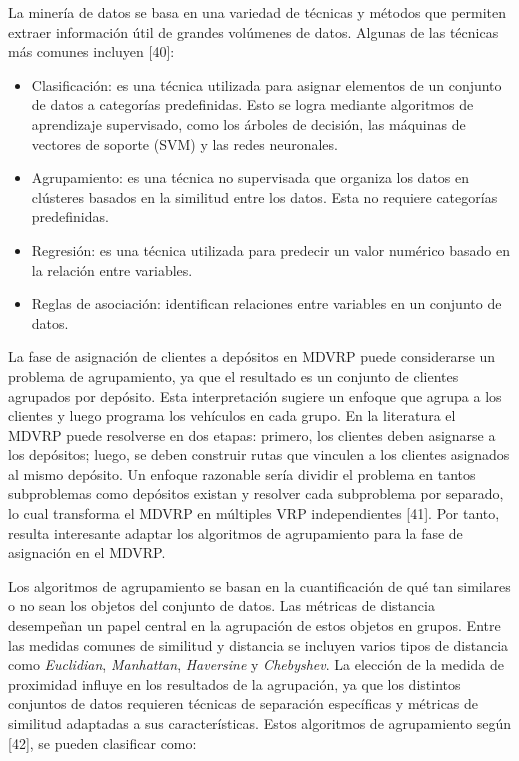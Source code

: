 La miner\'ia de datos se basa en una variedad de t\'ecnicas y m\'etodos que permiten extraer informaci\'on \'util de grandes vol\'umenes de datos. Algunas de las t\'ecnicas m\'as comunes incluyen [40]:

\begin{itemize}
  \item Clasificaci\'on: es una t\'ecnica utilizada para asignar elementos de un conjunto de datos a categor\'ias predefinidas. Esto se logra mediante algoritmos de aprendizaje supervisado, como los \'arboles de decisi\'on, las m\'aquinas de vectores de soporte (SVM) y las redes neuronales.
  \item Agrupamiento: es una t\'ecnica no supervisada que organiza los datos en cl\'usteres basados en la similitud entre los datos. Esta no requiere categor\'ias predefinidas.
  \item Regresi\'on: es una t\'ecnica utilizada para predecir un valor num\'erico basado en la relaci\'on entre variables.
  \item Reglas de asociaci\'on: identifican relaciones entre variables en un conjunto de datos.
\end{itemize}

La fase de asignaci\'on de clientes a dep\'ositos en MDVRP puede considerarse un problema de agrupamiento, ya que el resultado es un conjunto de clientes agrupados por dep\'osito. Esta interpretaci\'on sugiere un enfoque que agrupa a los clientes y luego programa los veh\'iculos en cada grupo. En la literatura el MDVRP puede resolverse en dos etapas: primero, los clientes deben asignarse a los dep\'ositos; luego, se deben construir rutas que vinculen a los clientes asignados al mismo dep\'osito. Un enfoque razonable ser\'ia dividir el problema en tantos subproblemas como dep\'ositos existan y resolver cada subproblema por separado, lo cual transforma el MDVRP en m\'ultiples VRP independientes [41]. Por tanto, resulta interesante adaptar los algoritmos de agrupamiento para la fase de asignaci\'on en el MDVRP.

Los algoritmos de agrupamiento se basan en la cuantificaci\'on de qu\'e tan similares o no sean los objetos del conjunto de datos. Las m\'etricas de distancia desempe\~nan un papel central en la agrupaci\'on de estos objetos en grupos. Entre las medidas comunes de similitud y distancia se incluyen varios tipos de distancia como \textit{Euclidian}, \textit{Manhattan}, \textit{Haversine} y \textit{Chebyshev}. La elecci\'on de la medida de proximidad influye en los resultados de la agrupaci\'on, ya que los distintos conjuntos de datos requieren t\'ecnicas de separaci\'on espec\'ificas y m\'etricas de similitud adaptadas a sus caracter\'isticas. Estos algoritmos de agrupamiento seg\'un [42], se pueden clasificar como:

